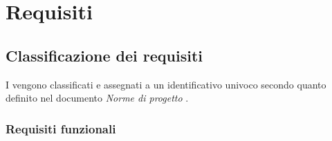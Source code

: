 \documentclass[AnalisiDeiRequisiti.tex]{subfiles}
\begin{document}

\chapter{Requisiti}
\section{Classificazione dei requisiti}
I  vengono classificati e assegnati a un identificativo univoco secondo quanto definito nel documento \textit{Norme di progetto \vrquattro}.

\subsection{Requisiti funzionali}
\end{document}
